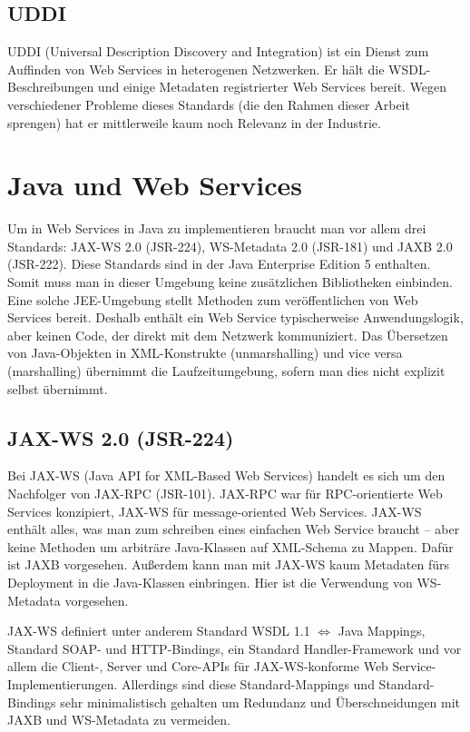 \documentclass[runningheads]{llncs}
\begin{document}
  \label{uddi}
  \subsection{UDDI}
    UDDI\cite{wk_uddi} (Universal Description Discovery and Integration) ist ein Dienst zum
    Auffinden von Web Services in heterogenen Netzwerken. Er hält die WSDL-Beschreibungen und
    einige Metadaten registrierter Web Services bereit. Wegen verschiedener Probleme dieses
    Standards (die den Rahmen dieser Arbeit sprengen) hat er mittlerweile kaum noch Relevanz in der
    Industrie.


  \label{wsj}
  \section{Java und Web Services}
    Um in Web Services in Java zu implementieren braucht man vor allem drei Standards: JAX-WS 2.0
    (JSR-224), WS-Metadata 2.0 (JSR-181) und JAXB 2.0 (JSR-222). Diese Standards sind in der Java
    Enterprise Edition 5 enthalten. Somit muss man in dieser Umgebung keine zusätzlichen
    Bibliotheken einbinden. Eine solche JEE-Umgebung stellt Methoden zum veröffentlichen von Web
    Services bereit. Deshalb enthält ein Web Service typischerweise Anwendungslogik, aber keinen
    Code, der direkt mit dem Netzwerk kommuniziert. Das Übersetzen von Java-Objekten in
    XML-Konstrukte (unmarshalling) und vice versa
    (marshalling) übernimmt die Laufzeitumgebung, sofern man dies nicht
    explizit selbst übernimmt.


  \label{jsr224}
  \subsection{JAX-WS 2.0 (JSR-224)}
    Bei JAX-WS\cite{jsr_224} (Java API for XML-Based Web Services) handelt es sich um den
    Nachfolger von JAX-RPC (JSR-101). JAX-RPC war für RPC-orientierte Web Services konzipiert,
    JAX-WS für message-oriented Web Services. JAX-WS enthält alles, was man zum schreiben eines
    einfachen Web Service braucht -- aber keine Methoden um arbiträre Java-Klassen auf XML-Schema
    zu Mappen. Dafür ist JAXB vorgesehen. Außerdem kann man mit JAX-WS kaum Metadaten fürs
    Deployment in die Java-Klassen einbringen. Hier ist die Verwendung von WS-Metadata vorgesehen.

    JAX-WS definiert unter anderem Standard WSDL 1.1 $\Leftrightarrow$ Java Mappings, Standard
    SOAP- und HTTP-Bindings, ein Standard Handler-Framework und vor allem die Client-, Server und
    Core-APIs für JAX-WS-konforme Web Service-Im\-ple\-men\-tier\-ung\-en. Allerdings sind diese
    Standard-Mappings und Standard-Bindings sehr minimalistisch gehalten um Redundanz und
    Überschneidungen mit JAXB und WS-Metadata zu vermeiden.\vfill
\end{document}
